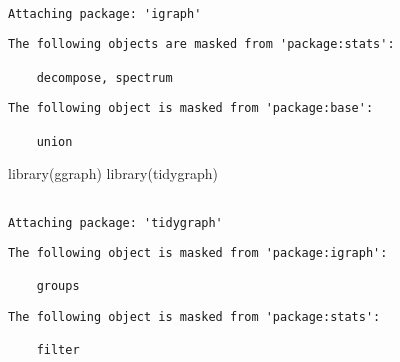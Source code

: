 \documentclass[
  12,
  letterpaper,
  DIV=11,
  numbers=noendperiod]{scrartcl}
\newenvironment{Shaded}{\begin{snugshade}}{\end{snugshade}}
\newcommand{\FunctionTok}[1]{\textcolor[rgb]{0.28,0.35,0.67}{#1}}
\newcommand{\NormalTok}[1]{\textcolor[rgb]{0.00,0.23,0.31}{#1}}
\begin{document}
\begin{verbatim}

Attaching package: 'igraph'
\end{verbatim}

\begin{verbatim}
The following objects are masked from 'package:stats':

    decompose, spectrum
\end{verbatim}

\begin{verbatim}
The following object is masked from 'package:base':

    union
\end{verbatim}

\begin{Shaded}
\begin{Highlighting}[numbers=left,,]
\FunctionTok{library}\NormalTok{(ggraph)}
\FunctionTok{library}\NormalTok{(tidygraph)}
\end{Highlighting}
\end{Shaded}

\begin{verbatim}

Attaching package: 'tidygraph'
\end{verbatim}

\begin{verbatim}
The following object is masked from 'package:igraph':

    groups
\end{verbatim}

\begin{verbatim}
The following object is masked from 'package:stats':

    filter
\end{verbatim}
\end{document}
